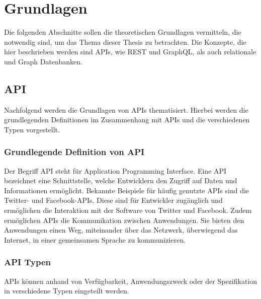 \chapter{Grundlagen} %
\label{sec:grundlagen}
Die folgenden Abschnitte sollen die theoretischen Grundlagen vermitteln, die notwendig sind, um das Thema dieser Thesis zu betrachten. Die Konzepte, die hier beschrieben werden sind APIs, wie REST und GraphQL, als auch relationale und Graph Datenbanken.
\section{API} %
\label{sec:apigrundlagen}
Nachfolgend werden die Grundlagen von APIs thematisiert. Hierbei werden die grundlegenden Definitionen im Zusammenhang mit APIs und die verschiedenen Typen vorgestellt.
\subsection{Grundlegende Definition von API} %
\label{sec:grundlegendedefinitionvonapi}
Der Begriff \glqq API\grqq{}  steht für \glqq Application Programming Interface\grqq{}. Eine API bezeichnet eine Schnittstelle, welche Entwicklern den Zugriff auf Daten und Informationen ermöglicht. Bekannte Beispiele für häufig genutzte APIs sind die Twitter- und Facebook-APIs. Diese sind für Entwickler zugänglich und ermöglichen die Interaktion mit der Software von Twitter und Facebook. Zudem ermöglichen APIs die Kommunikation zwischen Anwendungen. Sie bieten den Anwendungen einen Weg, miteinander über das Netzwerk, überwiegend das Internet, in einer gemeinsamen Sprache zu kommunizieren. \citep{apistrategyguide}
\subsection{API Typen} %
\label{sec:apitypen}
APIs können anhand von Verfügbarkeit, Anwendungszweck oder der Spezifikation in verschiedene Typen eingeteilt werden.

